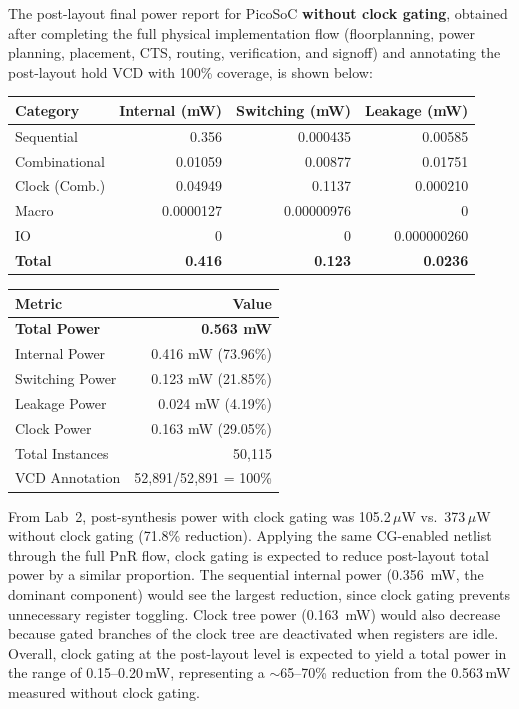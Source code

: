 \documentclass{article}
\begin{document}
\begin{tcolorbox}[colback=white, colframe=black, width=\textwidth, title=Answer 3.1]

The post-layout final power report for PicoSoC \textbf{without clock gating}, obtained after completing the full physical implementation flow (floorplanning, power planning, placement, CTS, routing, verification, and signoff) and annotating the post-layout hold VCD with 100\% coverage, is shown below:

\vspace{0.2cm}

\begin{tabular}{@{}lrrr@{}}
\toprule
\textbf{Category} & \textbf{Internal (mW)} & \textbf{Switching (mW)} & \textbf{Leakage (mW)} \\
\midrule
Sequential     & 0.356   & 0.000435 & 0.00585 \\
Combinational  & 0.01059 & 0.00877  & 0.01751 \\
Clock (Comb.)  & 0.04949 & 0.1137   & 0.000210 \\
Macro          & 0.0000127 & 0.00000976 & 0 \\
IO             & 0       & 0        & 0.000000260 \\
\midrule
\textbf{Total} & \textbf{0.416} & \textbf{0.123} & \textbf{0.0236} \\
\bottomrule
\end{tabular}

\vspace{0.2cm}

\begin{tabular}{@{}lr@{}}
\toprule
\textbf{Metric} & \textbf{Value} \\
\midrule
\textbf{Total Power} & \textbf{0.563 mW} \\
Internal Power       & 0.416 mW (73.96\%) \\
Switching Power      & 0.123 mW (21.85\%) \\
Leakage Power        & 0.024 mW (4.19\%) \\
\midrule
Clock Power          & 0.163 mW (29.05\%) \\
Total Instances      & 50{,}115 \\
VCD Annotation       & 52{,}891/52{,}891 = 100\% \\
\bottomrule
\end{tabular}

\vspace{0.3cm}

From Lab~2, post-synthesis power with clock gating was 105.2\,$\mu$W vs.\ 373\,$\mu$W without clock gating (71.8\% reduction). Applying the same CG-enabled netlist through the full PnR flow, clock gating is expected to reduce post-layout total power by a similar proportion. The sequential internal power (0.356~mW, the dominant component) would see the largest reduction, since clock gating prevents unnecessary register toggling. Clock tree power (0.163~mW) would also decrease because gated branches of the clock tree are deactivated when registers are idle. Overall, clock gating at the post-layout level is expected to yield a total power in the range of 0.15--0.20\,mW, representing a $\sim$65--70\% reduction from the 0.563\,mW measured without clock gating.


\end{tcolorbox}
\end{document}
